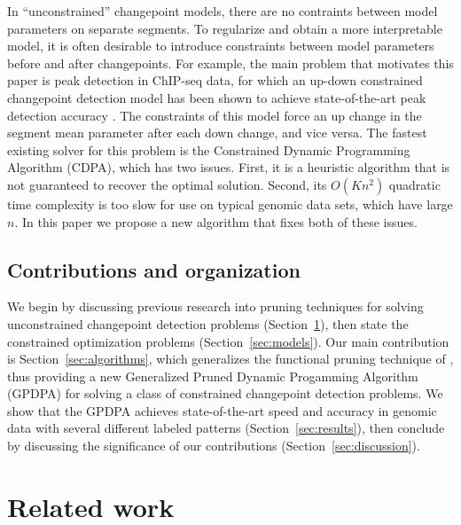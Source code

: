 \documentclass{article}
\begin{document}
In ``unconstrained'' changepoint models, there are no contraints
between model parameters on separate segments. To regularize and obtain a more
interpretable model, it is often desirable to introduce constraints
between model parameters before and after changepoints. 
For example, the main problem that motivates this paper is peak
detection in ChIP-seq data, for which an up-down constrained
changepoint detection model has been shown to achieve state-of-the-art
peak detection accuracy \citep{HOCKING-PeakSeg}. The constraints of
this model force an up change in the segment mean parameter after
each down change, and vice versa.
The fastest existing solver for this problem is the Constrained
Dynamic Programming Algorithm (CDPA), which has two issues. First, it
is a heuristic algorithm that is not guaranteed to recover the optimal
solution. Second, its $O(Kn^2)$ quadratic time complexity is too slow
for use on typical genomic data sets, which have large $n$. In this
paper we propose a new algorithm that fixes both of these issues.

\subsection{Contributions and organization}

We begin by discussing previous research into pruning techniques for
solving unconstrained changepoint detection problems
(Section~\ref{sec:related}), then state the constrained optimization
problems (Section~\ref{sec:models}). Our main contribution is
Section~\ref{sec:algorithms}, which generalizes the functional pruning
technique of \citet{pruned-dp}, thus providing a new Generalized
Pruned Dynamic Progamming Algorithm (GPDPA) for solving a class of
constrained changepoint detection problems. We show that the GPDPA
achieves state-of-the-art speed and accuracy in genomic data with
several different labeled patterns (Section~\ref{sec:results}), then
conclude by discussing the significance of our contributions
(Section~\ref{sec:discussion}).

\section{Related work}
\label{sec:related}
\end{document}
